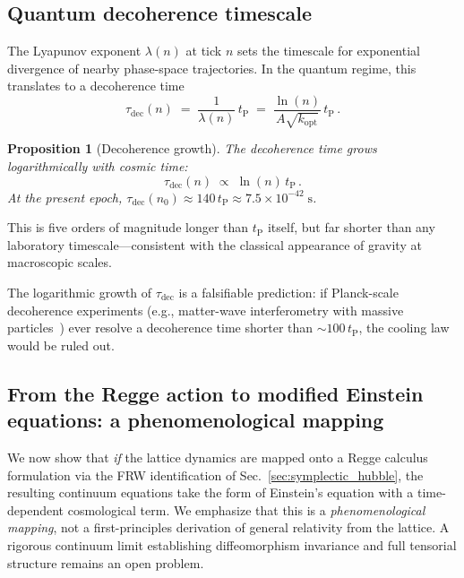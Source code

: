 \documentclass[twocolumn,showpacs,preprintnumbers,amsmath,amssymb,prd]{revtex4-2}
\newtheorem{proposition}{Proposition}
\newcommand{\tP}{t_{\mathrm{P}}}
\begin{document}
\subsection{Quantum decoherence timescale}
\label{sec:decoherence}

The Lyapunov exponent $\lambda(n)$ at tick $n$ sets the timescale
for exponential divergence of nearby phase-space trajectories.
In the quantum regime, this translates to a decoherence time
\begin{equation}
  \tau_{\mathrm{dec}}(n)
  \;=\; \frac{1}{\lambda(n)}\,\tP
  \;=\; \frac{\ln(n)}{A\sqrt{k_{\mathrm{opt}}}}\,\tP\,.
  \label{eq:tau_dec}
\end{equation}

\begin{proposition}[Decoherence growth]\label{prop:decoherence}
The decoherence time grows logarithmically with cosmic time:
\begin{equation}
  \tau_{\mathrm{dec}}(n) \;\propto\; \ln(n)\,\tP\,.
  \label{eq:tau_dec_scaling}
\end{equation}
At the present epoch,
$\tau_{\mathrm{dec}}(n_0) \approx 140\,\tP
\approx 7.5 \times 10^{-42}\;\mathrm{s}$.
\end{proposition}

This is five orders of magnitude longer than $\tP$ itself,
but far shorter than any laboratory timescale---consistent with
the classical appearance of gravity at macroscopic scales.

The logarithmic growth of $\tau_{\mathrm{dec}}$ is a falsifiable
prediction: if Planck-scale decoherence experiments (e.g.,
matter-wave interferometry with massive particles~\cite{Arndt2014})
ever resolve a decoherence time shorter than $\sim 100\,\tP$,
the cooling law would be ruled out.

\subsection{From the Regge action to modified Einstein equations:
a phenomenological mapping}
\label{sec:einstein}

We now show that \emph{if} the lattice dynamics are mapped onto
a Regge calculus formulation via the FRW identification of
Sec.~\ref{sec:symplectic_hubble}, the resulting continuum equations
take the form of Einstein's equation with a time-dependent
cosmological term.
We emphasize that this is a \emph{phenomenological mapping},
not a first-principles derivation of general relativity from
the lattice.
A rigorous continuum limit establishing diffeomorphism invariance
and full tensorial structure remains an open problem.
\end{document}
